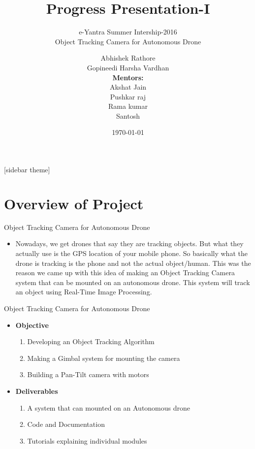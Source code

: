 \documentclass[10pt, a4paper]{beamer}
\begin{document}
	\title{Progress Presentation-I}
	\subtitle{e-Yantra Summer Intership-2016 \\ Object Tracking Camera for Autonomous Drone}
	\author{Abhishek Rathore\\ Gopineedi Harsha Vardhan\\
	\textbf{Mentors:}\\Akshat Jain\\Pushkar raj\\Rama kumar\\Santosh}
	\date{\today}
	\frame{\titlepage}

[sidebar theme]
\section{Overview of Project}
\begin{frame}{Object Tracking Camera for Autonomous Drone}
	\begin{itemize}
		\item Nowadays, we get drones that say they are tracking objects. But what they actually use is the GPS location of your mobile phone. So basically what the drone is tracking is the phone and not the actual object/human. This was the reason we came up with this idea of making an Object Tracking Camera system that can be mounted on an autonomous drone. This system will track an object using Real-Time Image Processing.
		\end{itemize}
\end{frame}
\begin{frame}{Object Tracking Camera for Autonomous Drone}
  \begin{itemize}
		\item \textbf{Objective}
		   \begin{enumerate}
		     \item Developing an Object Tracking Algorithm
		     \item Making a Gimbal system for mounting the camera
		     \item Building a Pan-Tilt camera with motors 
		   \end{enumerate}
		\item \textbf{Deliverables}
		\begin{enumerate}
		     \item A system that can mounted on an Autonomous drone
		     \item Code and Documentation
		     \item Tutorials explaining individual modules
		\end{enumerate}
		\end{itemize}
\end{frame}
\end{document}
